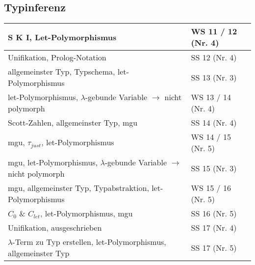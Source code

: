 \subsection*{Typinferenz}
\begin{table}[h]
\centering
\label{my-label}
\begin{tabular}{l|l}
	S K I, Let-Polymorphismus
	& WS 11 / 12  (Nr. 4) \\ \hline
	
	Unifikation, Prolog-Notation
	& SS 12 (Nr. 4) \\ \hline
	
	allgemeinster Typ, Typschema, let-Polymorphismus 
	& SS 13 (Nr. 3)\\ \hline
	
	let-Polymorphismus, $\lambda$-gebunde Variable $\rightarrow$ nicht polymorph 
	& WS 13 / 14 (Nr. 4)\\ \hline
	
	Scott-Zahlen, allgemeinster Typ, mgu 
	& SS 14 (Nr. 4)\\ \hline
	
	mgu, $\tau_{just}$, let-Polymorphismus
	& WS 14 / 15 (Nr. 5) \\ \hline
	
	mgu, let-Polymorphismus, $\lambda$-gebunde Variable $\rightarrow$ nicht polymorph
	& SS 15 (Nr. 3) \\ \hline
	
	mgu, allgemeinster Typ, Typabstraktion, let-Polymorphismus
	& WS 15 / 16 (Nr. 5) \\ \hline
	
	$C_0$ \& $C_{let}$, let-Polymorphismus, mgu
	& SS 16 (Nr. 5) \\ \hline
	
	Unifikation, ausgeschrieben
	& SS 17 (Nr. 4) \\ \hline
	
	$\lambda$-Term zu Typ erstellen, let-Polymorphismus, allgemeinster Typ
	& SS 17 (Nr. 5) \\ \hline
\end{tabular}
\end{table}
\FloatBarrier

